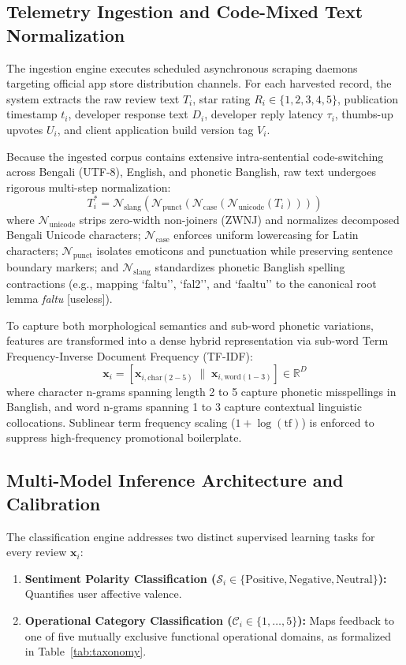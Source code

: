 \documentclass[review,12pt,authoryear]{elsarticle}
\begin{document}
\subsection{Telemetry Ingestion and Code-Mixed Text Normalization}
The ingestion engine executes scheduled asynchronous scraping daemons targeting official app store distribution channels. For each harvested record, the system extracts the raw review text $T_i$, star rating $R_i \in \{1, 2, 3, 4, 5\}$, publication timestamp $t_i$, developer response text $D_i$, developer reply latency $\tau_i$, thumbs-up upvotes $U_i$, and client application build version tag $V_i$.

Because the ingested corpus contains extensive intra-sentential code-switching across Bengali (UTF-8), English, and phonetic Banglish, raw text undergoes rigorous multi-step normalization:
\begin{equation}
T_i^* = \mathcal{N}_{\text{slang}}\left(\mathcal{N}_{\text{punct}}\left(\mathcal{N}_{\text{case}}\left(\mathcal{N}_{\text{unicode}}(T_i)\right)\right)\right)
\end{equation}
where $\mathcal{N}_{\text{unicode}}$ strips zero-width non-joiners (ZWNJ) and normalizes decomposed Bengali Unicode characters; $\mathcal{N}_{\text{case}}$ enforces uniform lowercasing for Latin characters; $\mathcal{N}_{\text{punct}}$ isolates emoticons and punctuation while preserving sentence boundary markers; and $\mathcal{N}_{\text{slang}}$ standardizes phonetic Banglish spelling contractions (e.g., mapping `faltu'', `fal2'', and `faaltu'' to the canonical root lemma \textit{faltu} [useless]).

To capture both morphological semantics and sub-word phonetic variations, features are transformed into a dense hybrid representation via sub-word Term Frequency-Inverse Document Frequency (TF-IDF):
\begin{equation}
\mathbf{x}_i = \left[ \mathbf{x}_{i, \text{char}(2-5)} \;\|\; \mathbf{x}_{i, \text{word}(1-3)} \right] \in \mathbb{R}^D
\end{equation}
where character n-grams spanning length 2 to 5 capture phonetic misspellings in Banglish, and word n-grams spanning 1 to 3 capture contextual linguistic collocations. Sublinear term frequency scaling ($1 + \log(\text{tf})$) is enforced to suppress high-frequency promotional boilerplate.

\subsection{Multi-Model Inference Architecture and Calibration}
The classification engine addresses two distinct supervised learning tasks for every review $\mathbf{x}_i$:
\begin{enumerate}
    \item \textbf{Sentiment Polarity Classification ($\mathcal{S}_i \in \{\text{Positive}, \text{Negative}, \text{Neutral}\}$):} Quantifies user affective valence.
    \item \textbf{Operational Category Classification ($\mathcal{C}_i \in \{1, \dots, 5\}$):} Maps feedback to one of five mutually exclusive functional operational domains, as formalized in Table~\ref{tab:taxonomy}.
\end{enumerate}
\end{document}
